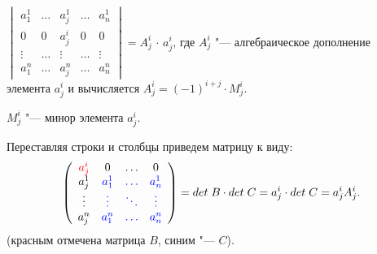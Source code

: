 \begin{lemma}
  $\begin{vmatrix}
    a_1^1 & \ldots & a_j^1 & \ldots & a_n^1 \\
    0 & 0 & a_j^i & 0 & 0 \\
    \vdots& \ldots& \vdots & \ldots & \vdots \\
    a_1^n & \ldots & a_j^n & \ldots & a_n^n 
  \end{vmatrix} = A_j^i \, \cdot \, a_j^i$, где $A_j^i$ "--- алгебраическое дополнение элемента $a_j^i$ и вычисляется $A_j^i = (-1)^{i + j} \cdot M_j^i$. 
  
  $M_j^i$ "--- минор элемента $a_j^i$.
\end{lemma}
\begin{Proof}
  Переставляя строки и столбцы приведем матрицу к виду:
  $$
  \left(\begin{array}{cccc}
    \textcolor{red}{a_j^i} & 0 & \ldots & 0 \\
    a_j^1 & \textcolor{blue}{a_1^1} & \textcolor{blue}{\ldots} & \textcolor{blue}{a_n^1} \\
    \vdots & \textcolor{blue}{\vdots} & \textcolor{blue}{\ddots} & \textcolor{blue}{\vdots} \\
    a_j^n & \textcolor{blue}{a_1^n} & \textcolor{blue}{\ldots} & \textcolor{blue}{a_n^n}
  \end{array}\right) = det\;B \cdot det\;C = a_j^i \cdot det\;C = a_j^i A_j^i.
  $$ 
  (красным отмечена матрица $B$, синим "--- $C$).
\end{Proof}

